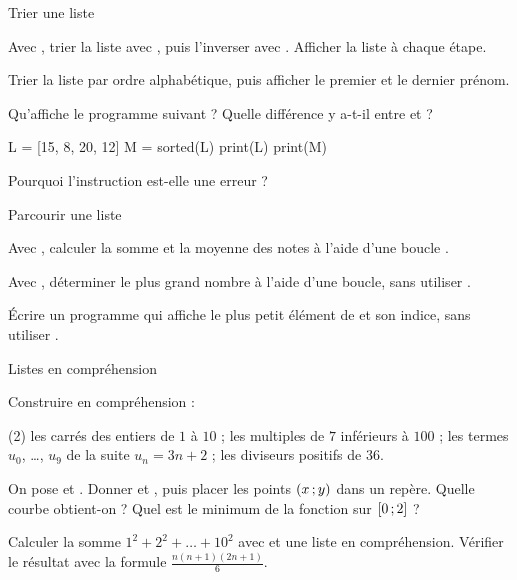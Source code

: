 
\begin{exercice}[2]{Trier une liste}
\begin{questions}
  \item Avec , trier la liste avec , puis l'inverser avec . Afficher la liste à
    chaque étape.
  \item Trier la liste  par ordre alphabétique, puis afficher le premier et le dernier
    prénom.
  \item Qu'affiche le programme suivant ? Quelle différence y a-t-il entre  et  ?
\begin{python}
L = [15, 8, 20, 12]
M = sorted(L)
print(L)
print(M)
\end{python}
  \item Pourquoi l'instruction  est-elle une erreur ?
\end{questions}
\end{exercice}

\begin{exercice}[2]{Parcourir une liste}
\begin{questions}
  \item Avec , calculer la somme et la moyenne des notes à l'aide d'une boucle .
  \item Avec , déterminer le plus grand nombre à l'aide d'une boucle, sans utiliser .
  \item Écrire un programme qui affiche le plus petit élément de  et son indice, sans utiliser .
\end{questions}
\end{exercice}

\begin{exercice}[2]{Listes en compréhension}
\begin{questions}
  \item Construire en compréhension :
\begin{tasks}[label=\alph*)](2)
  \task les carrés des entiers de $1$ à $10$ ;
  \task les multiples de $7$ inférieurs à $100$ ;
  \task les termes $u_0$, …, $u_9$ de la suite $u_n=3n+2$ ;
  \task les diviseurs positifs de $36$.
\end{tasks}
  \item On pose  et . Donner  et , puis
    placer les points $(x\,{;}\, y)$ dans un repère. Quelle courbe obtient-on ? Quel est le minimum de la fonction sur $\mathopen{[}0\,{;}\,2\mathclose{]}$ ?
  \item Calculer la somme $1^{2}+2^{2}+\dots+10^{2}$ avec  et une liste en compréhension. Vérifier le résultat avec la
    formule $\frac{n(n+1)(2n+1)}{6}$.
\end{questions}
\end{exercice}

